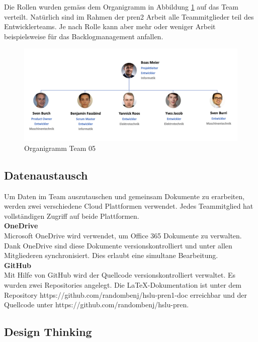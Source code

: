 Die Rollen wurden gemäss dem Organigramm in Abbildung \ref{fig:organigramm} auf das Team verteilt. Natürlich sind im Rahmen der \acrshort{pren2} Arbeit alle Teammitglieder teil des Entwicklerteams.
Je nach Rolle kann aber mehr oder weniger Arbeit beispielsweise für das Backlogmanagement anfallen.

\begin{figure}[H]
  \includegraphics[width=1.0\textwidth]{img/projektmanagement/Organigramm PREN2.png}
  \centering
  \caption{Organigramm Team 05}
  \label{fig:organigramm}
\end{figure}

\newpage

\subsection{Datenaustausch}
Um Daten im Team auszutauschen und gemeinsam Dokumente zu erarbeiten, werden zwei verschiedene Cloud Plattformen verwendet. Jedes Teammitglied hat vollständigen Zugriff auf beide Plattformen.\\

\textbf{OneDrive}\\
Microsoft OneDrive wird verwendet, um Office 365 Dokumente zu verwalten. Dank OneDrive sind diese Dokumente versionskontrolliert und unter allen Mitgliederen synchronisiert. Dies erlaubt eine simultane Bearbeitung.\\

\textbf{GitHub}\\
Mit Hilfe von GitHub wird der Quellcode versionskontrolliert verwaltet. Es wurden zwei Repositories angelegt. Die \LaTeX-Dokumentation ist unter dem Repository https://github.com/randombenj/hslu-pren1-doc erreichbar und der Quellcode unter https://github.com/randombenj/hslu-pren.

\newpage

\subsection{Design Thinking}
\label{sec:design-thinking}


